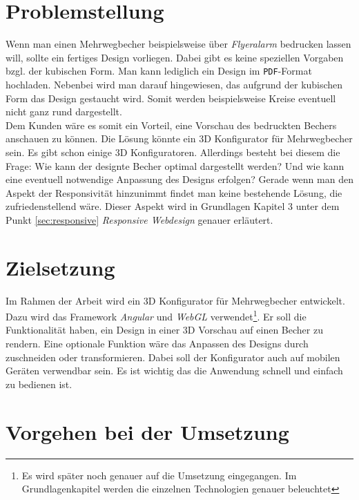\section{Problemstellung}
\label{sec:problemstellung}
%
Wenn man einen Mehrwegbecher beispielsweise über \textit{Flyeralarm} bedrucken lassen will, sollte ein fertiges Design vorliegen. Dabei gibt es keine speziellen Vorgaben bzgl. der kubischen Form. Man kann lediglich ein Design im \texttt{PDF}-Format hochladen. Nebenbei wird man darauf hingewiesen, das aufgrund der kubischen Form das Design gestaucht wird. Somit werden beispielsweise Kreise eventuell nicht ganz rund dargestellt. \\ 
%
Dem Kunden wäre es somit ein Vorteil, eine Vorschau des bedruckten Bechers anschauen zu können. Die Lösung könnte ein 3D Konfigurator für Mehrwegbecher sein. Es gibt schon einige 3D Konfiguratoren. Allerdings besteht bei diesem die Frage: Wie kann der designte Becher optimal dargestellt werden? Und wie kann eine eventuell notwendige Anpassung des Designs erfolgen? Gerade wenn man den Aspekt der Responsivität hinzunimmt findet man keine bestehende Lösung, die zufriedenstellend wäre. Dieser Aspekt wird in Grundlagen Kapitel 3 unter dem Punkt \ref{sec:responsive} \textit{Responsive Webdesign} genauer erläutert.
%
%
%
%
%
\section{Zielsetzung}
\label{sec:zielsetzung}
%
Im Rahmen der Arbeit wird ein 3D Konfigurator für Mehrwegbecher entwickelt. Dazu wird das Framework \textit{Angular} und \textit{WebGL} verwendet\footnote{Es wird später noch genauer auf die Umsetzung eingegangen. Im Grundlagenkapitel werden die einzelnen Technologien genauer beleuchtet}. Er soll die Funktionalität haben, ein Design in einer 3D Vorschau auf einen Becher zu rendern. Eine optionale Funktion wäre das Anpassen des Designs durch zuschneiden oder transformieren. Dabei soll der Konfigurator auch auf mobilen Geräten verwendbar sein. Es ist wichtig das die Anwendung schnell und einfach zu bedienen ist.
%
%
%
%
%
%
\section{Vorgehen bei der Umsetzung}
\label{sec:vorgehen}
%

